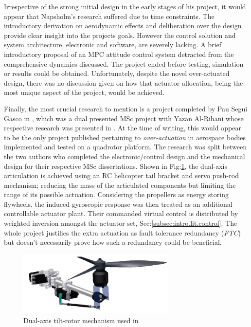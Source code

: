 \par
Irrespective of the strong initial design in the early stages of his project, it would appear that Napsholm's research suffered due to time constraints. The introductory derivation on aerodynamic effects and deliberation over the design provide clear insight into the projects goals. However the control solution and system architecture, electronic and software, are severely lacking. A brief introductory proposal of an MPC attitude control system detracted from the comprehensive dynamics discussed. The project ended before testing, simulation or results could be obtained. Unfortunately, despite the novel over-actuated design, there was no discussion given on how that actuator allocation, being the most unique aspect of the project, would be achieved.
\par
Finally, the most crucial research to mention is a project completed by Pau Segui Gasco in \cite{tiltgasco}, which was a dual presented MSc project with Yazan Al-Rihani whose respective research was presented in \cite{tiltrihani}. At the time of writing, this would appear to be the only project published pertaining to \emph{over-actuation} in aerospace bodies implemented and tested on a quadrotor platform. The research was split between the two authors who completed the electronic/control design and the mechanical design for their respective MSc dissertations. Shown in Fig:\ref{fig:tiltrotor-gasco}, the dual-axis articulation is achieved using an RC helicopter tail bracket and servo push-rod mechanism; reducing the mass of the articulated components but limiting the range of its possible actuation. Considering the propellers as energy storing flywheels, the induced gyroscopic response was then treated as an additional controllable actuator plant. Their commanded virtual control is distributed by weighted inversion amongst the actuator set, Sec:\ref{subsec:intro.lit.control}. The whole project justifies the extra actuation as fault tolerance redundancy (\emph{FTC}) but doesn't necessarily prove how such a redundancy could be beneficial.
\begin{figure}[htbp]
\centering
\includegraphics[width=0.7\textwidth]{figs/gasco-mech}
\caption{Dual-axis tilt-rotor mechanism used in \cite{tiltgasco}}
\label{fig:tiltrotor-gasco}
\end{figure}
